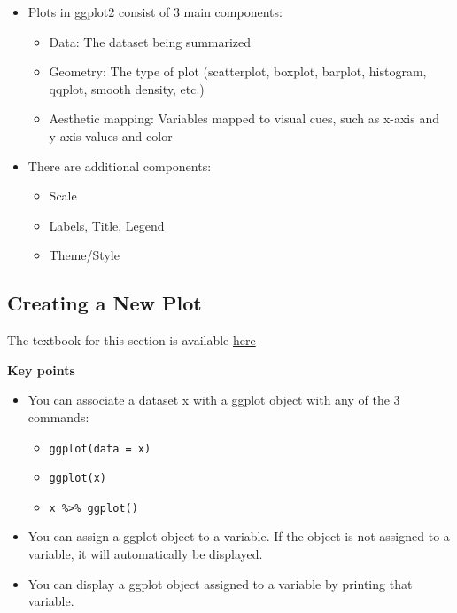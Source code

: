 \documentclass[
]{article}
\providecommand{\tightlist}{%
  \setlength{\itemsep}{0pt}\setlength{\parskip}{0pt}}
\begin{document}
\begin{itemize}
\tightlist
\item
  Plots in ggplot2 consist of 3 main components:

  \begin{itemize}
  \tightlist
  \item
    Data: The dataset being summarized
  \item
    Geometry: The type of plot (scatterplot, boxplot, barplot,
    histogram, qqplot, smooth density, etc.)
  \item
    Aesthetic mapping: Variables mapped to visual cues, such as x-axis
    and y-axis values and color
  \end{itemize}
\item
  There are additional components:

  \begin{itemize}
  \tightlist
  \item
    Scale
  \item
    Labels, Title, Legend
  \item
    Theme/Style
  \end{itemize}
\end{itemize}

\hypertarget{creating-a-new-plot}{%
\subsection{Creating a New Plot}\label{creating-a-new-plot}}

The textbook for this section is available
\href{https://rafalab.github.io/dsbook/ggplot2.html\#ggplot-objects}{here}

\textbf{Key points}

\begin{itemize}
\tightlist
\item
  You can associate a dataset x with a ggplot object with any of the 3
  commands:

  \begin{itemize}
  \tightlist
  \item
    \texttt{ggplot(data\ =\ x)}
  \item
    \texttt{ggplot(x)}
  \item
    \texttt{x\ \%\textgreater{}\%\ ggplot()}
  \end{itemize}
\item
  You can assign a ggplot object to a variable. If the object is not
  assigned to a variable, it will automatically be displayed.
\item
  You can display a ggplot object assigned to a variable by printing
  that variable.
\end{itemize}
\end{document}
